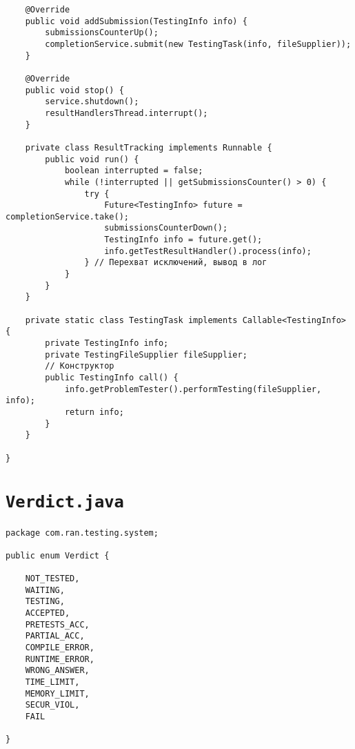 \begin{verbatim}
    @Override
    public void addSubmission(TestingInfo info) {
        submissionsCounterUp();
        completionService.submit(new TestingTask(info, fileSupplier));
    }

    @Override
    public void stop() {
        service.shutdown();
        resultHandlersThread.interrupt();
    }
    
    private class ResultTracking implements Runnable {
        public void run() {
            boolean interrupted = false;
            while (!interrupted || getSubmissionsCounter() > 0) {
                try {
                    Future<TestingInfo> future = completionService.take();
                    submissionsCounterDown();
                    TestingInfo info = future.get();
                    info.getTestResultHandler().process(info);
                } // Перехват исключений, вывод в лог
            }
        }
    }
    
    private static class TestingTask implements Callable<TestingInfo> {
        private TestingInfo info;
        private TestingFileSupplier fileSupplier;
        // Конструктор
        public TestingInfo call() {
            info.getProblemTester().performTesting(fileSupplier, info);
            return info;
        }
    }
    
}
\end{verbatim}

\section*{\texttt{Verdict.java}}
\begin{verbatim}
package com.ran.testing.system;

public enum Verdict {

    NOT_TESTED,
    WAITING,
    TESTING,
    ACCEPTED,
    PRETESTS_ACC,
    PARTIAL_ACC,
    COMPILE_ERROR,
    RUNTIME_ERROR,
    WRONG_ANSWER,
    TIME_LIMIT,
    MEMORY_LIMIT,
    SECUR_VIOL,
    FAIL

}
\end{verbatim}

